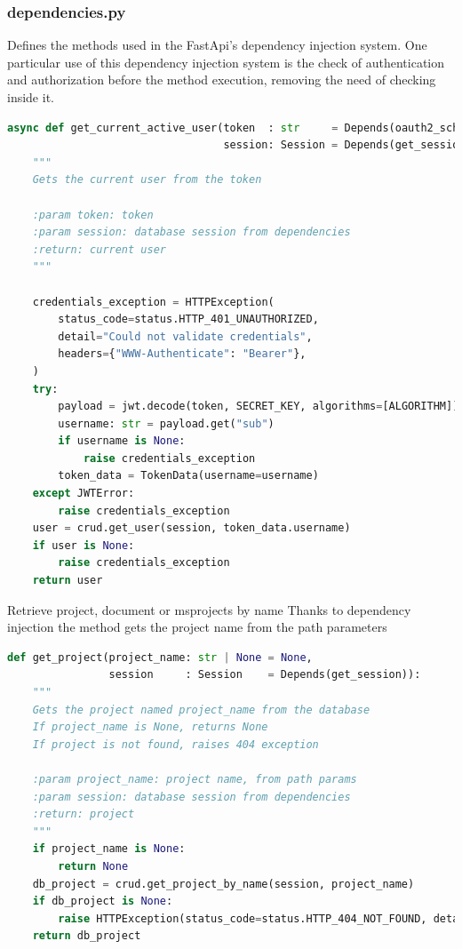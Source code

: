 \documentclass[12pt]{report}
\begin{document}
\subsubsection{dependencies.py}
Defines the methods used in the FastApi’s dependency injection system.
One particular use of this dependency injection system is the check of authentication and authorization before the method execution, removing the need of checking inside it.

\begin{lstlisting}[language=Python, caption=Retrieve current authenticated user]
async def get_current_active_user(token  : str     = Depends(oauth2_scheme),
                                  session: Session = Depends(get_session)):
    """
    Gets the current user from the token

    :param token: token
    :param session: database session from dependencies
    :return: current user
    """

    credentials_exception = HTTPException(
        status_code=status.HTTP_401_UNAUTHORIZED,
        detail="Could not validate credentials",
        headers={"WWW-Authenticate": "Bearer"},
    )
    try:
        payload = jwt.decode(token, SECRET_KEY, algorithms=[ALGORITHM])
        username: str = payload.get("sub")
        if username is None:
            raise credentials_exception
        token_data = TokenData(username=username)
    except JWTError:
        raise credentials_exception
    user = crud.get_user(session, token_data.username)
    if user is None:
        raise credentials_exception
    return user
\end{lstlisting}

Retrieve project, document or msprojects by name
Thanks to dependency injection the method gets the project name from the path parameters


\begin{lstlisting}[language=Python, caption=Retrieve project]
def get_project(project_name: str | None = None,
                session     : Session    = Depends(get_session)):
    """
    Gets the project named project_name from the database
    If project_name is None, returns None
    If project is not found, raises 404 exception

    :param project_name: project name, from path params
    :param session: database session from dependencies
    :return: project
    """
    if project_name is None:
        return None
    db_project = crud.get_project_by_name(session, project_name)
    if db_project is None:
        raise HTTPException(status_code=status.HTTP_404_NOT_FOUND, detail="Project not found")
    return db_project
\end{lstlisting}
\end{document}

